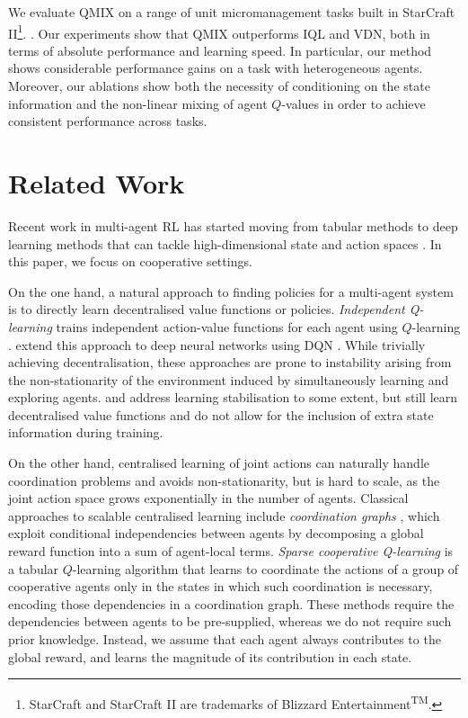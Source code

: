 \documentclass{article}
\begin{document}
We evaluate QMIX on a range of unit micromanagement tasks built in StarCraft II\footnote{StarCraft and StarCraft II are trademarks of Blizzard Entertainment\textsuperscript{TM}.}. \cite{vinyals_starcraft_2017}. Our experiments show that QMIX outperforms IQL and VDN, both in terms of absolute performance and learning speed.
In particular, our method shows considerable performance gains on a task with heterogeneous agents. Moreover, our ablations show both the necessity of conditioning on the state information and the non-linear mixing of agent $Q$-values in order to achieve consistent performance across tasks. 




 \section{Related Work}
\label{sec:related}

Recent work in multi-agent RL has started moving from 
tabular methods \cite{yang_multiagent_2004, busoniu_comprehensive_2008} to deep learning methods that can tackle
high-dimensional state and action spaces \cite{tampuu_multiagent_2015,foerster_counterfactual_2017,peng_multiagent_2017}. In this paper, we 
focus on cooperative settings.

On the one hand, a natural approach to finding policies for a multi-agent system 
is to directly learn decentralised value functions or policies. 
\emph{Independent Q-learning} \cite{tan_multi-agent_1993} trains independent
action-value functions for each agent using $Q$-learning \cite{watkins_learning_1989}. \cite{tampuu_multiagent_2015} extend this approach to 
deep neural networks using DQN \cite{mnih_human-level_2015}.
While trivially achieving decentralisation, these approaches are prone to instability arising from the non-stationarity of the environment 
induced by simultaneously learning and exploring agents. 
\citet{omidshafiei_deep_2017} and \citet{foerster_stabilising_2017} address 
learning stabilisation to some extent, but still learn decentralised value 
functions and do not allow for the inclusion of extra state information during training.

On the other hand, centralised learning of joint actions can naturally handle 
coordination problems and avoids non-stationarity, but is hard to scale, as the joint action space grows exponentially in the 
number of agents.
Classical approaches to scalable centralised learning include 
\textit{coordination graphs} \cite{guestrin_multiagent_2002}, which exploit conditional independencies between agents by decomposing a global reward function 
into a sum of agent-local terms.
\textit{Sparse cooperative Q-learning} \cite{kok_collaborative_2006} is a tabular $Q$-learning 
algorithm that learns to coordinate the actions of a group of cooperative 
agents only in the states in which such coordination is necessary, encoding
those dependencies in a coordination graph. 
These methods require the dependencies between agents to be pre-supplied, whereas we do not require such prior knowledge. 
Instead, we assume that each agent always contributes to the global reward, and learns the magnitude of its contribution in each state.
\end{document}

